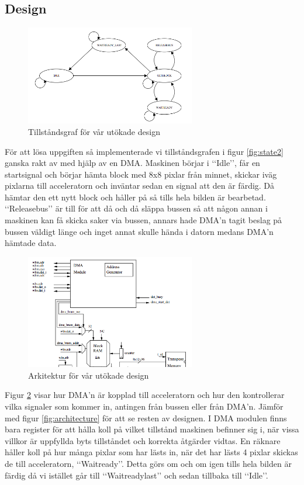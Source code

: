 \documentclass[a4paper]{article}
\begin{document}
\subsection{Design}
\begin{figure}[h]
\centering
\includegraphics[width=280px]{fsmlab3.png}
\caption{Tillståndsgraf för vår utökade design}
\label{fig:state}
\end{figure}
För att lösa uppgiften så implementerade vi tillståndsgrafen i figur \ref{fig:state2} ganska rakt av med hjälp av en DMA. Maskinen börjar i \lq\lq{}Idle\rq\rq{}, får en startsignal och börjar hämta block med 8x8 pixlar från minnet, skickar iväg pixlarna till acceleratorn och inväntar sedan en signal att den är färdig. Då hämtar den ett nytt block och håller på så tills hela bilden är bearbetad. \lq\lq{}Releasebus\rq\rq{} är till för att då och då släppa bussen så att någon annan i maskinen kan få skicka saker via bussen, annars hade DMA\rq{}n tagit beslag på bussen väldigt länge och inget annat skulle hända i datorn medans DMA\rq{}n hämtade data.

\begin{figure}[h]
\centering
\includegraphics[width=280px]{architecturelab3.png}
\caption{Arkitektur för vår utökade design}
\label{fig:arch3}
\end{figure}
Figur \ref{fig:arch3} visar hur DMA\rq{}n är kopplad till acceleratorn och hur den kontrollerar vilka signaler som kommer in, antingen från bussen eller från DMA\rq{}n. Jämför med figur \ref{fig:architecture} för att se resten av designen. I DMA modulen finns bara register för att hålla koll på vilket tillstånd maskinen befinner sig i, när vissa villkor är uppfyllda byts tillståndet och korrekta åtgärder vidtas. En räknare håller koll på hur många pixlar som har lästs in, när det har lästs 4 pixlar skickas de till acceleratorn, \lq\lq{}Waitready\rq\rq{}. Detta görs om och om igen tills hela bilden är färdig då vi istället går till \lq\lq{}Waitreadylast\rq\rq{} och sedan tillbaka till \lq\lq{}Idle\rq\rq{}.
\end{document}
